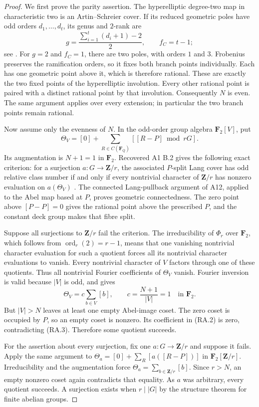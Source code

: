 \documentclass[11pt,a4paper]{article}
\begin{document}
\begin{proof}
We first prove the parity assertion.  The hyperelliptic
degree-two map in characteristic two is an Artin--Schreier
cover.  If its reduced geometric poles have odd orders
$d_1,\ldots,d_t$, its genus and $2$-rank are
\[
       g=\frac{\sum_{i=1}^t(d_i+1)-2}{2},
       \qquad f_C=t-1;
\]
see \cite[Lemma~2.6, p.~712]{PriesZhu2012}.
For $g=2$ and $f_C=1$, there are two poles, with
orders $1$ and $3$.  Frobenius preserves the ramification
orders, so it fixes both branch points individually.
Each has one geometric point above it, which is therefore
rational.  These are exactly the two fixed points of the
hyperelliptic involution.  Every other rational point is
paired with a distinct rational point by that involution.
Consequently $N$ is even.  The same argument applies over
every extension; in particular the two branch points remain
rational.

Now assume only the evenness of $N$.
In the odd-order group algebra $\mathbf F_2[V]$, put
\[
 \Theta_V=[0]+\sum_{R\in C(\mathbf F_Q)}[[R-P]\bmod rG].
\tag{RA.2}
\]
Its augmentation is $N+1=1$ in $\mathbf F_2$.
Recovered A1 B.2 gives the following exact criterion:
for a surjection $a:G\to\mathbf Z/r$, the associated
$P$-split Lang cover has odd relative class number if and
only if every nontrivial character of $\mathbf Z/r$ has
nonzero evaluation on $a(\Theta_V)$
\cite[B.2]{A1run}.
The connected Lang-pullback argument of A12, applied
to the Abel map based at $P$, proves geometric connectedness.
The zero point above $[P-P]=0$ gives the rational point
above the prescribed $P$, and the constant deck group
makes that fibre split.

Suppose all surjections to $\mathbf Z/r$ fail the criterion.
The irreducibility of $\Phi_r$ over $\mathbf F_2$, which
follows from $\operatorname{ord}_r(2)=r-1$, means that
one vanishing nontrivial character evaluation for such a
quotient forces all its nontrivial character evaluations
to vanish.  Every nontrivial character of $V$ factors
through one of these quotients.  Thus all nontrivial
Fourier coefficients of $\Theta_V$ vanish.
Fourier inversion is valid because $|V|$ is odd, and gives
\[
        \Theta_V=c\sum_{b\in V}[b],\qquad
        c=\frac{N+1}{|V|}=1\quad\text{in }\mathbf F_2.
\tag{RA.3}
\]
But $|V|>N$ leaves at least one empty Abel-image coset.
The zero coset is occupied by $P$, so an empty coset is
nonzero.  Its coefficient in (RA.2) is zero, contradicting
(RA.3).  Therefore some quotient succeeds.

For the assertion about every surjection, fix one
$a:G\to\mathbf Z/r$ and suppose it fails.
Apply the same argument to
$\Theta_a=[0]+\sum_R[a([R-P])]$ in
$\mathbf F_2[\mathbf Z/r]$.
Irreducibility and the augmentation force
$\Theta_a=\sum_{b\in\mathbf Z/r}[b]$.
Since $r>N$, an empty nonzero coset again contradicts
that equality.  As $a$ was arbitrary, every quotient
succeeds.  A surjection exists when $r\mid|G|$ by the
structure theorem for finite abelian groups.
\end{proof}
\end{document}
